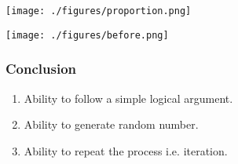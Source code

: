 \begin{frame}
\centerline{\texttt{[image: ./figures/proportion.png]}}
\end{frame}

\begin{frame}
\centerline{\texttt{[image: ./figures/before.png]}}
\end{frame}

\begin{frame}
\frametitle{Conclusion}
\begin{enumerate}
  \item Ability to follow a simple logical argument.
  \vspace{1cm}
  \item Ability to generate random number.
  \vspace{1cm}
  \item Ability to repeat the process i.e. iteration.
\end{enumerate}
\end{frame}


 